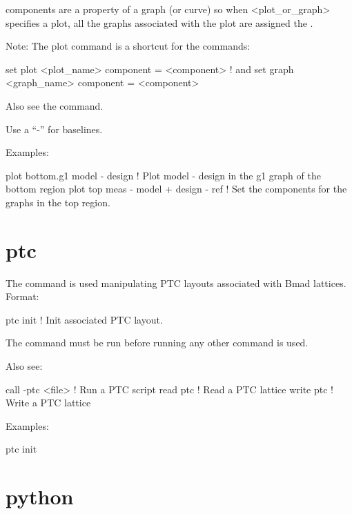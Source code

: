 \vskip 10pt 

components are a property of a graph (or curve) so when <plot_or_graph> specifies a plot,
all the graphs associated with the plot are assigned the .

Note: The plot command is a shortcut for the commands:
\begin{example}
  set plot <plot_name> component = <component>     ! and
  set graph <graph_name> component = <component>
\end{example}
Also see the  command.

Use a ``-'' for baselines. 

Examples:
\begin{example}
  plot bottom.g1 model - design        ! Plot model - design in the g1 graph of the bottom region
  plot top meas - model + design - ref ! Set the components for the graphs in the top region.
\end{example}

\section{ptc}
\label{s:ptc}

The  command is used manipulating PTC layouts associated with Bmad
lattices. Format:
\begin{example}
  ptc init            ! Init associated PTC layout.
\end{example}

\vskip 10pt 

The  command must be run before running any other  command is used.

Also see:
\begin{example}
  call -ptc <file>         ! Run a PTC script
  read ptc                 ! Read a PTC lattice
  write ptc                ! Write a PTC lattice
\end{example}

Examples:
\begin{example}
  ptc init
\end{example}

\section{python}
\label{s:python}

